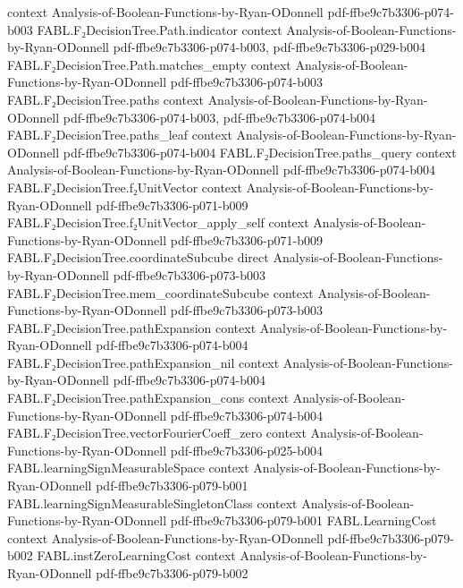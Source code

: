 \begin{theorem}
  {context}
  {Analysis-of-Boolean-Functions-by-Ryan-ODonnell}
  {pdf-ffbe9c7b3306-p074-b003}
\proofstep
  {FABL.F₂DecisionTree.Path.indicator}
  {context}
  {Analysis-of-Boolean-Functions-by-Ryan-ODonnell}
  {pdf-ffbe9c7b3306-p074-b003,
    pdf-ffbe9c7b3306-p029-b004}
\proofstep
  {FABL.F₂DecisionTree.Path.matches_empty}
  {context}
  {Analysis-of-Boolean-Functions-by-Ryan-ODonnell}
  {pdf-ffbe9c7b3306-p074-b003}
\proofstep
  {FABL.F₂DecisionTree.paths}
  {context}
  {Analysis-of-Boolean-Functions-by-Ryan-ODonnell}
  {pdf-ffbe9c7b3306-p074-b003,
    pdf-ffbe9c7b3306-p074-b004}
\proofstep
  {FABL.F₂DecisionTree.paths_leaf}
  {context}
  {Analysis-of-Boolean-Functions-by-Ryan-ODonnell}
  {pdf-ffbe9c7b3306-p074-b004}
\proofstep
  {FABL.F₂DecisionTree.paths_query}
  {context}
  {Analysis-of-Boolean-Functions-by-Ryan-ODonnell}
  {pdf-ffbe9c7b3306-p074-b004}
\proofstep
  {FABL.F₂DecisionTree.f₂UnitVector}
  {context}
  {Analysis-of-Boolean-Functions-by-Ryan-ODonnell}
  {pdf-ffbe9c7b3306-p071-b009}
\proofstep
  {FABL.F₂DecisionTree.f₂UnitVector_apply_self}
  {context}
  {Analysis-of-Boolean-Functions-by-Ryan-ODonnell}
  {pdf-ffbe9c7b3306-p071-b009}
\proofstep
  {FABL.F₂DecisionTree.coordinateSubcube}
  {direct}
  {Analysis-of-Boolean-Functions-by-Ryan-ODonnell}
  {pdf-ffbe9c7b3306-p073-b003}
\proofstep
  {FABL.F₂DecisionTree.mem_coordinateSubcube}
  {context}
  {Analysis-of-Boolean-Functions-by-Ryan-ODonnell}
  {pdf-ffbe9c7b3306-p073-b003}
\proofstep
  {FABL.F₂DecisionTree.pathExpansion}
  {context}
  {Analysis-of-Boolean-Functions-by-Ryan-ODonnell}
  {pdf-ffbe9c7b3306-p074-b004}
\proofstep
  {FABL.F₂DecisionTree.pathExpansion_nil}
  {context}
  {Analysis-of-Boolean-Functions-by-Ryan-ODonnell}
  {pdf-ffbe9c7b3306-p074-b004}
\proofstep
  {FABL.F₂DecisionTree.pathExpansion_cons}
  {context}
  {Analysis-of-Boolean-Functions-by-Ryan-ODonnell}
  {pdf-ffbe9c7b3306-p074-b004}
\proofstep
  {FABL.F₂DecisionTree.vectorFourierCoeff_zero}
  {context}
  {Analysis-of-Boolean-Functions-by-Ryan-ODonnell}
  {pdf-ffbe9c7b3306-p025-b004}
\proofstep
  {FABL.learningSignMeasurableSpace}
  {context}
  {Analysis-of-Boolean-Functions-by-Ryan-ODonnell}
  {pdf-ffbe9c7b3306-p079-b001}
\proofstep
  {FABL.learningSignMeasurableSingletonClass}
  {context}
  {Analysis-of-Boolean-Functions-by-Ryan-ODonnell}
  {pdf-ffbe9c7b3306-p079-b001}
\proofstep
  {FABL.LearningCost}
  {context}
  {Analysis-of-Boolean-Functions-by-Ryan-ODonnell}
  {pdf-ffbe9c7b3306-p079-b002}
\proofstep
  {FABL.instZeroLearningCost}
  {context}
  {Analysis-of-Boolean-Functions-by-Ryan-ODonnell}
  {pdf-ffbe9c7b3306-p079-b002}

\end{theorem}
